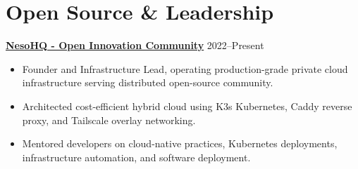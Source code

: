 \documentclass[11pt,a4paper]{article}
\begin{document}
\section*{Open Source \& Leadership}
\href{https://nesohq.org}{\textbf{NesoHQ - Open Innovation Community}} \hfill 2022--Present
\begin{itemize}[leftmargin=*,noitemsep]
    \item Founder and Infrastructure Lead, operating production-grade private cloud infrastructure serving distributed open-source community.
    \item Architected cost-efficient hybrid cloud using K3s Kubernetes, Caddy reverse proxy, and Tailscale overlay networking.
    \item Mentored developers on cloud-native practices, Kubernetes deployments, infrastructure automation, and software deployment.
\end{itemize}
\end{document}
